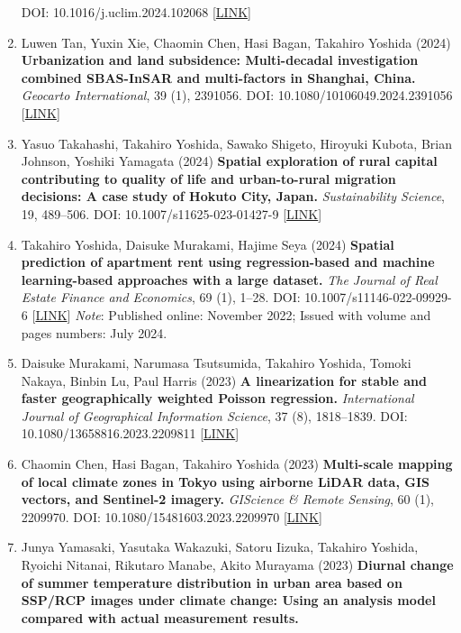 \documentclass[
]{book}
\begin{document}
\begin{enumerate}
  DOI: 10.1016/j.uclim.2024.102068 {[}\href{https://www.sciencedirect.com/science/article/pii/S2212095524002645}{LINK}{]}
\item
  Luwen Tan, Yuxin Xie, Chaomin Chen, Hasi Bagan, Takahiro Yoshida (2024)
  \textbf{Urbanization and land subsidence: Multi-decadal investigation combined SBAS-InSAR and multi-factors in Shanghai, China.}
  \emph{Geocarto International}, 39 (1), 2391056.
  DOI: 10.1080/10106049.2024.2391056 {[}\href{https://www.tandfonline.com/doi/full/10.1080/10106049.2024.2391056}{LINK}{]}
\item
  Yasuo Takahashi, Takahiro Yoshida, Sawako Shigeto, Hiroyuki Kubota, Brian Johnson, Yoshiki Yamagata (2024)
  \textbf{Spatial exploration of rural capital contributing to quality of life and urban-to-rural migration decisions: A case study of Hokuto City, Japan.}
  \emph{Sustainability Science}, 19, 489--506.
  DOI: 10.1007/s11625-023-01427-9 {[}\href{https://link.springer.com/article/10.1007/s11625-023-01427-9}{LINK}{]}
\item
  Takahiro Yoshida, Daisuke Murakami, Hajime Seya (2024)
  \textbf{Spatial prediction of apartment rent using regression-based and machine learning-based approaches with a large dataset.}
  \emph{The Journal of Real Estate Finance and Economics}, 69 (1), 1--28.
  DOI: 10.1007/s11146-022-09929-6 {[}\href{https://link.springer.com/article/10.1007/s11146-022-09929-6}{LINK}{]}
  \emph{Note}: Published online: November 2022; Issued with volume and pages numbers: July 2024.
\item
  Daisuke Murakami, Narumasa Tsutsumida, Takahiro Yoshida, Tomoki Nakaya, Binbin Lu, Paul Harris (2023)
  \textbf{A linearization for stable and faster geographically weighted Poisson regression.}
  \emph{International Journal of Geographical Information Science}, 37 (8), 1818--1839.
  DOI: 10.1080/13658816.2023.2209811 {[}\href{https://www.tandfonline.com/doi/full/10.1080/13658816.2023.2209811}{LINK}{]}
\item
  Chaomin Chen, Hasi Bagan, Takahiro Yoshida (2023)
  \textbf{Multi-scale mapping of local climate zones in Tokyo using airborne LiDAR data, GIS vectors, and Sentinel-2 imagery.}
  \emph{GIScience \& Remote Sensing}, 60 (1), 2209970.
  DOI: 10.1080/15481603.2023.2209970 {[}\href{https://www.tandfonline.com/doi/full/10.1080/15481603.2023.2209970}{LINK}{]}
\item
  Junya Yamasaki, Yasutaka Wakazuki, Satoru Iizuka, Takahiro Yoshida, Ryoichi Nitanai, Rikutaro Manabe, Akito Murayama (2023)
  \textbf{Diurnal change of summer temperature distribution in urban area based on SSP/RCP images under climate change: Using an analysis model compared with actual measurement results.}

\end{enumerate}
\end{document}
